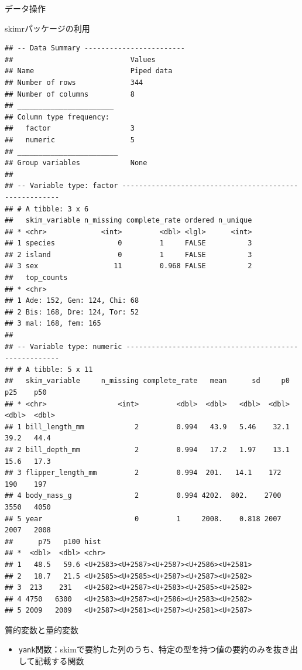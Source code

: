 \documentclass[
  ignorenonframetext,
]{beamer}
\providecommand{\tightlist}{%
  \setlength{\itemsep}{0pt}\setlength{\parskip}{0pt}}
\begin{document}
\begin{frame}[fragile]{データ操作}
\begin{block}{skimrパッケージの利用}
\begin{verbatim}
## -- Data Summary ------------------------
##                            Values    
## Name                       Piped data
## Number of rows             344       
## Number of columns          8         
## _______________________              
## Column type frequency:               
##   factor                   3         
##   numeric                  5         
## ________________________             
## Group variables            None      
## 
## -- Variable type: factor -------------------------------------------------------
## # A tibble: 3 x 6
##   skim_variable n_missing complete_rate ordered n_unique
## * <chr>             <int>         <dbl> <lgl>      <int>
## 1 species               0         1     FALSE          3
## 2 island                0         1     FALSE          3
## 3 sex                  11         0.968 FALSE          2
##   top_counts                 
## * <chr>                      
## 1 Ade: 152, Gen: 124, Chi: 68
## 2 Bis: 168, Dre: 124, Tor: 52
## 3 mal: 168, fem: 165         
## 
## -- Variable type: numeric ------------------------------------------------------
## # A tibble: 5 x 11
##   skim_variable     n_missing complete_rate   mean      sd     p0    p25    p50
## * <chr>                 <int>         <dbl>  <dbl>   <dbl>  <dbl>  <dbl>  <dbl>
## 1 bill_length_mm            2         0.994   43.9   5.46    32.1   39.2   44.4
## 2 bill_depth_mm             2         0.994   17.2   1.97    13.1   15.6   17.3
## 3 flipper_length_mm         2         0.994  201.   14.1    172    190    197  
## 4 body_mass_g               2         0.994 4202.  802.    2700   3550   4050  
## 5 year                      0         1     2008.    0.818 2007   2007   2008  
##      p75   p100 hist 
## *  <dbl>  <dbl> <chr>
## 1   48.5   59.6 <U+2583><U+2587><U+2587><U+2586><U+2581>
## 2   18.7   21.5 <U+2585><U+2585><U+2587><U+2587><U+2582>
## 3  213    231   <U+2582><U+2587><U+2583><U+2585><U+2582>
## 4 4750   6300   <U+2583><U+2587><U+2586><U+2583><U+2582>
## 5 2009   2009   <U+2587><U+2581><U+2587><U+2581><U+2587>
\end{verbatim}
\end{block}

\begin{block}{質的変数と量的変数}
\protect\hypertarget{ux8ceaux7684ux5909ux6570ux3068ux91cfux7684ux5909ux6570}{}
\begin{itemize}
\tightlist
\item
  \texttt{yank}関数：skimで要約した列のうち、特定の型を持つ値の要約のみを抜き出して記載する関数
\end{itemize}


\end{block}
\end{frame}
\end{document}
